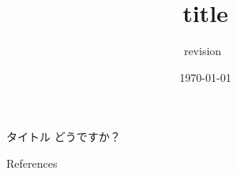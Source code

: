 \documentclass[dvipdfmx,12pt, xcolor={svgnames}]{beamer}
\title{title}
\author{}
\institute{}
\date{\today}
\subtitle{revision~\texttt{}}
\begin{document}
\begin{frame}
	\titlepage{}
\end{frame} %

\begin{frame}{タイトル}
	どうですか？
\end{frame}


\appendix
\begin{frame}[c,allowframebreaks]{References} %
	\printbibliography[heading=none] %
\end{frame} %
\end{document}
